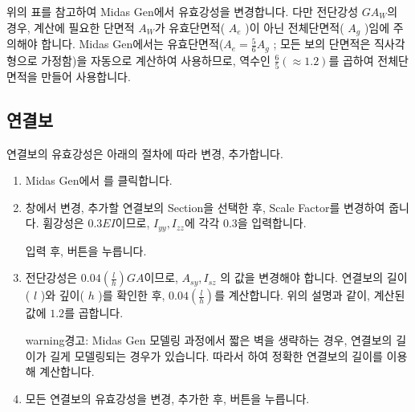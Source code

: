 \documentclass[a4paper,11pt,korean,openany,oneside]{sphinxmanual}
\begin{document}
\sphinxAtStartPar
위의 표를 참고하여 Midas Gen에서 유효강성을 변경합니다. 다만 전단강성 \(GA_W\)의 경우, 계산에 필요한 단면적 \(A_W\)가
유효단면적( \(A_e\) )이 아닌 전체단면적( \(A_g\) )임에 주의해야 합니다.
Midas Gen에서는 유효단면적(\(A_e = \frac{5}{6}A_g\) ; 모든 보의 단면적은 직사각형으로 가정함)을 자동으로 계산하여 사용하므로,
역수인 \(\frac{6}{5}(\approx 1.2)\)를 곱하여 전체단면적을 만들어 사용합니다.


\subsection{연결보}
\label{\detokenize{1_stiffness_setting:id3}}
\sphinxAtStartPar
연결보의 유효강성은 아래의 절차에 따라 변경, 추가합니다.

\begin{sphinxShadowBox}
\begin{enumerate}
%
\item {} 
\sphinxAtStartPar
Midas Gen에서  \sphinxhyphen{}  \sphinxhyphen{} 를 클릭합니다.

\item {} 
\sphinxAtStartPar
{} 창에서 변경, 추가할 연결보의 Section을 선택한 후, Scale Factor를 변경하여 줍니다.
휨강성은 \(0.3EI\)이므로, \(I_{yy}, I_{zz}\)에 각각 \(0.3\)을 입력합니다.


\sphinxAtStartPar
입력 후,  버튼을 누릅니다.

\item {} 
\sphinxAtStartPar
전단강성은 \(0.04(\frac{l}{h})GA\)이므로, \(A_{sy}, I_{sz}\) 의 값을 변경해야 합니다.
연결보의 길이( \(l\) )와 깊이( \(h\) )를 확인한 후, \(0.04(\frac{l}{h})\)를 계산합니다.
위의 설명과 같이, 계산된 값에 \(1.2\)를 곱합니다.

\begin{center}
\noindent{}
\end{center}

\begin{sphinxadmonition}{warning}{경고:}
\sphinxAtStartPar
Midas Gen 모델링 과정에서 짧은 벽을 생략하는 경우, 연결보의 길이가 길게 모델링되는 경우가 있습니다.
따라서  하여 정확한 연결보의 길이를 이용해 계산합니다.
\end{sphinxadmonition}

\item {} 
\sphinxAtStartPar
모든 연결보의 유효강성을 변경, 추가한 후,  버튼을 누릅니다.

\end{enumerate}
\end{sphinxShadowBox}
\end{document}
